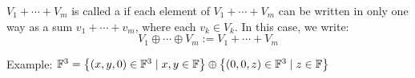 \setcounter{thm}{40}
\begin{mydef}
  \label{def: direct sum}
  $V_1 + \cdots + V_m$ is called a  if each element of $V_1 +\cdots+V_m$ can be written in only one way as a sum $v_1 + \cdots + v_m$, where each $v_k \in V_k$. In this case, we write:
  \begin{equation}
    V_1 \oplus \cdots \oplus V_m := V_1 + \cdots + V_m
  \end{equation}
\end{mydef}

\begin{example}
  Example: $\mathbb{F}^3 =
  \left \{ \left ( x, y, 0 \right ) \in \mathbb{F}^3 \mid x,y \in \mathbb{F} \right \}
  \oplus
  \left \{ \left (  0, 0, z  \right ) \in \mathbb{F}^3 \mid z \in \mathbb{F} \right \}$
\end{example}


